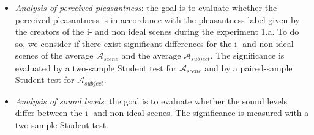 \documentclass[12pt]{elsarticle}
\newcommand{\ie}{\emph{i.\,e.}}
\begin{document}
\begin{itemize}


\item \emph{Analysis of perceived pleasantness}: the goal is to evaluate whether the perceived pleasantness is in accordance with the pleasantness label given by the creators of the  i- and non ideal scenes during the experiment 1.a. To do so, we consider if there exist significant differences for the i- and non ideal scenes of the average $\mathcal{A}_{scene}$ and the average $\mathcal{A}_{subject}$. The significance is evaluated by a two-sample Student test for $\mathcal{A}_{scene}$ and by a paired-sample Student test for $\mathcal{A}_{subject}$.




\item \emph{Analysis of sound levels}: the goal is to evaluate whether the sound levels differ between the i- and non ideal scenes. The significance is measured with a two-sample Student test.



\end{itemize}
\end{document}
